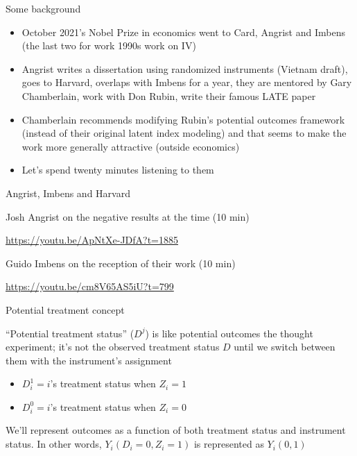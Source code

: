 \documentclass{beamer}
\begin{document}
\begin{frame}{Some background}

  \begin{itemize}
    \item October 2021's Nobel Prize in economics went to Card, Angrist and Imbens (the last two for work 1990s work on IV)
    \item Angrist writes a dissertation using randomized instruments (Vietnam draft), goes to Harvard, overlaps with Imbens for a year, they are mentored by Gary Chamberlain, work with Don Rubin, write their famous LATE paper
    \item Chamberlain recommends modifying Rubin's potential outcomes framework (instead of their original latent index modeling) and that seems to make the work more generally attractive (outside economics)
    \item Let's spend twenty minutes listening to them
  \end{itemize}

\end{frame}

\begin{frame}{Angrist, Imbens and Harvard}


  Josh Angrist on the negative results at the time (10 min)

  \url{https://youtu.be/ApNtXe-JDfA?t=1885}

  Guido Imbens on the reception of their work (10 min)

  \url{https://youtu.be/cm8V65AS5iU?t=799}

\end{frame}




\begin{frame}{Potential treatment concept}

  ``Potential treatment status'' ($D^j$) is like potential outcomes the thought experiment; it's not the observed treatment status $D$ until we switch between them with the instrument's assignment
  \bigskip
  \begin{itemize}
    \item $D^1_{i} = i$'s treatment status when $Z_i=1$
    \item $D^0_{i} = i$'s treatment status when $Z_i=0$
  \end{itemize}
  \bigskip
  We'll represent outcomes as a function of both treatment status and instrument status. In other words, $Y_i(D_i=0,Z_i=1)$ is represented as $Y_i(0,1)$

\end{frame}
\end{document}
